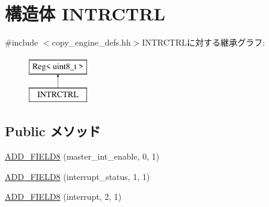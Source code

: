\hypertarget{structCopyEngineReg_1_1Regs_1_1INTRCTRL}{
\section{構造体 INTRCTRL}
\label{structCopyEngineReg_1_1Regs_1_1INTRCTRL}
}


{\ttfamily \#include $<$copy\_\-engine\_\-defs.hh$>$}INTRCTRLに対する継承グラフ:\begin{figure}[H]
\begin{center}
\leavevmode
\includegraphics[height=2cm]{structCopyEngineReg_1_1Regs_1_1INTRCTRL}
\end{center}
\end{figure}
\subsection*{Public メソッド}
\begin{DoxyCompactItemize}
\item 
\hyperlink{structCopyEngineReg_1_1Regs_1_1INTRCTRL_a12cbbc592306a66421660d8c72a3b611}{ADD\_\-FIELD8} (master\_\-int\_\-enable, 0, 1)
\item 
\hyperlink{structCopyEngineReg_1_1Regs_1_1INTRCTRL_a12d2d37587f4a319fd602bf182bfafff}{ADD\_\-FIELD8} (interrupt\_\-status, 1, 1)
\item 
\hyperlink{structCopyEngineReg_1_1Regs_1_1INTRCTRL_ab54cf85b9369c95605f28ae500cc5383}{ADD\_\-FIELD8} (interrupt, 2, 1)
\end{DoxyCompactItemize}


